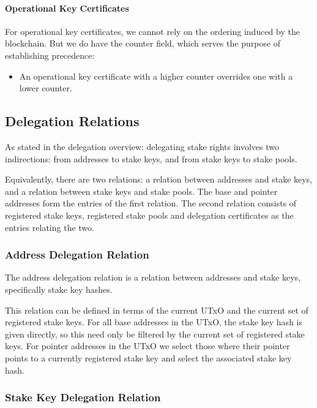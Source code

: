 \documentclass[11pt,a4paper]{article}
\begin{document}
\paragraph{Operational Key Certificates}
\label{operational-key-certificates-1}

For operational key certificates, we cannot rely on the ordering induced by
the blockchain. But we do have the counter field, which serves the
purpose of establishing precedence:

\begin{itemize}
\item
  An operational key certificate with a higher counter overrides one with a
  lower counter.
\end{itemize}

\subsection{Delegation Relations}
\label{delegation-relations}

As stated in the delegation overview: delegating stake rights involves
two indirections: from addresses to stake keys, and from stake keys to
stake pools.

Equivalently, there are two relations: a relation between addresses and
stake keys, and a relation between stake keys and stake pools. The base
and pointer addresses form the entries of the first relation. The second
relation consists of registered stake keys, registered stake pools and
delegation certificates as the entries relating the two.

\subsubsection{Address Delegation Relation}
\label{address-delegation-relation}

The address delegation relation is a relation between addresses and
stake keys, specifically stake key hashes.

This relation can be defined in terms of the current UTxO and the
current set of registered stake keys. For all base addresses in the
UTxO, the stake key hash is given directly, so this need only be
filtered by the current set of registered stake keys. For pointer
addresses in the UTxO we select those where their pointer points to a
currently registered stake key and select the associated stake key hash.

\subsubsection{Stake Key Delegation Relation}
\label{stake-key-delegation-relation}
\end{document}
